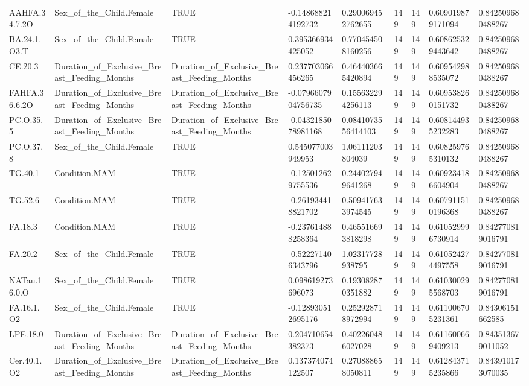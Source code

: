 \begin{longtable}{lllllllll}
AAHFA.34.7.2O & Sex\_of\_the\_Child.Female & TRUE & -0.148688214192732 & 0.290069452762655 & 149 & 149 & 0.609019879171094 & 0.842509680488267 \\
BA.24.1.O3.T & Sex\_of\_the\_Child.Female & TRUE & 0.395366934425052 & 0.770454508160256 & 149 & 149 & 0.608625329443642 & 0.842509680488267 \\
CE.20.3 & Duration\_of\_Exclusive\_Breast\_Feeding\_Months & Duration\_of\_Exclusive\_Breast\_Feeding\_Months & 0.237703066456265 & 0.464403665420894 & 149 & 149 & 0.609542988535072 & 0.842509680488267 \\
FAHFA.36.6.2O & Duration\_of\_Exclusive\_Breast\_Feeding\_Months & Duration\_of\_Exclusive\_Breast\_Feeding\_Months & -0.0796607904756735 & 0.155632294256113 & 149 & 149 & 0.609538260151732 & 0.842509680488267 \\
PC.O.35.5 & Duration\_of\_Exclusive\_Breast\_Feeding\_Months & Duration\_of\_Exclusive\_Breast\_Feeding\_Months & -0.0432185078981168 & 0.0841073556414103 & 149 & 149 & 0.608144935232283 & 0.842509680488267 \\
PC.O.37.8 & Sex\_of\_the\_Child.Female & TRUE & 0.545077003949953 & 1.06111203804039 & 149 & 149 & 0.608259765310132 & 0.842509680488267 \\
TG.40.1 & Condition.MAM & TRUE & -0.125012629755536 & 0.244027949641268 & 149 & 149 & 0.609234186604904 & 0.842509680488267 \\
TG.52.6 & Condition.MAM & TRUE & -0.261934418821702 & 0.509417633974545 & 149 & 149 & 0.607911510196368 & 0.842509680488267 \\
FA.18.3 & Condition.MAM & TRUE & -0.237614888258364 & 0.465516693818298 & 149 & 149 & 0.610529996730914 & 0.842770819016791 \\
FA.20.2 & Sex\_of\_the\_Child.Female & TRUE & -0.522271406343796 & 1.02317728938795 & 149 & 149 & 0.610524274497558 & 0.842770819016791 \\
NATau.16.0.O & Sex\_of\_the\_Child.Female & TRUE & 0.098619273696073 & 0.193082870351882 & 149 & 149 & 0.610300295568703 & 0.842770819016791 \\
FA.16.1.O2 & Sex\_of\_the\_Child.Female & TRUE & -0.128930512695176 & 0.252928718972994 & 149 & 149 & 0.611006705231361 & 0.84306151662585 \\
LPE.18.0 & Duration\_of\_Exclusive\_Breast\_Feeding\_Months & Duration\_of\_Exclusive\_Breast\_Feeding\_Months & 0.204710654382373 & 0.402260486027028 & 149 & 149 & 0.611600669409213 & 0.843513679011052 \\
Cer.40.1.O2 & Duration\_of\_Exclusive\_Breast\_Feeding\_Months & Duration\_of\_Exclusive\_Breast\_Feeding\_Months & 0.137374074122507 & 0.270888658050811 & 149 & 149 & 0.612843715235866 & 0.843910173070035 \\

\end{longtable}
